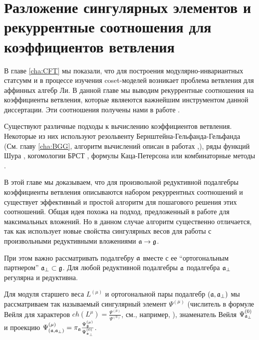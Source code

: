 
\chapter{Разложение сингулярных элементов и рекуррентные соотношения для коэффициентов ветвления}
\label{cha:affine-lie-algebras}

В главе \ref{cha:CFT} мы показали, что для построения модулярно-инвариантных статсумм и в процессе изучения coset-моделей возникает проблема ветвления для аффинных алгебр Ли.  В данной главе мы выводим рекуррентные соотношения на коэффициенты ветвления, которые являеются важнейшим инструментом данной диссертации. Эти соотношения получены нами в работе \cite{2010arXiv1007.0318L}.

Существуют различные подходы к вычислению коэффициентов ветвления. Некоторые из них используют резольвенту Бернштейна-Гельфанда-Гельфанда \cite{bernstein1975differential} (См. главу \ref{cha:BGG}, алгоритм вычислений описан в работах \cite{kac1990idl},\cite{wakimoto2001idl}), ряды функций Шура \cite{fauser2006new}, когомологии БРСТ  \cite{Hwang:1994yr}, формулы Каца-Петерсона  \cite{kac1990idl,quella2002branching} или комбинаторные методы \cite{feigin707principal}.

В этой главе мы доказываем, что для произвольной редуктивной подалгебры коэффициенты ветвления описываются набором рекуррентных соотношений и существует эффективный и простой алгоритм для пошагового решения этих соотношений. Общая идея похожа на подход, предложенный в работе  \cite{ilyin812pbc} для максимальных вложений. Но в данном случае алгоритм существенно отличается, так как использует новые свойства сингулярных весов для работы с произвольными редуктивными вложениями $\mathfrak{a} \rightarrow \mathfrak{g}$.

При этом важно рассматривать подалгебру  $\mathfrak{a}$ вместе с ее ``ортогональным партнером'' $\mathfrak{a}_{\perp}\subset \mathfrak{g}$. 
Для любой редуктивной подалгебры $\mathfrak{a}$ подалгебра $\mathfrak{a}_{\perp}$ регулярна и редуктивна. 

Для модуля старшего веса  $L^{\left( \mu \right)}$ и ортогональной пары подалгебр $\left(  \mathfrak{a}, \mathfrak{a}_{\perp} \right)$ мы рассматриваем так называемый сингулярный элемент  $\Psi^{\left( \mu \right)}$ (числитель в формуле Вейля для характеров
$ch\left( L^{\mu }\right) =\frac{\Psi ^{\left( \mu \right) }}{\Psi ^{\left( 0\right) }}$,
см., например, \cite{humphreys1997introduction}), 
знаменатель Вейля $\Psi ^{\left( 0\right) }_{\mathfrak{a}_{\perp}}$ и проекцию
$\Psi ^{\left( \mu \right) }_{\left(  \mathfrak{a}, \mathfrak{a}_{\perp} \right)}
=\pi_{\mathfrak{a}}\frac{\Psi ^{\left( \mu \right) }_{\mathfrak{g}}}{\Psi ^{\left( 0\right) }_{\mathfrak{a}_{\perp}}}$.

